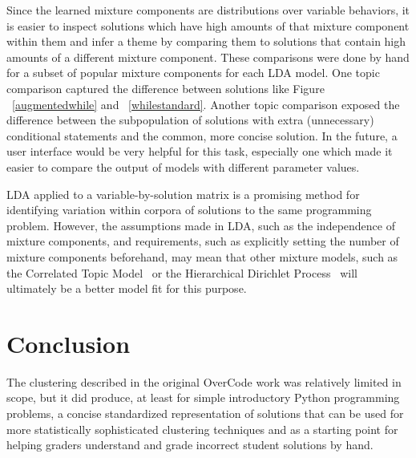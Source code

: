 Since the learned mixture components are distributions over variable behaviors, it is easier to inspect solutions which have high amounts of that mixture component within them and infer a theme by comparing them to solutions that contain high amounts of a different mixture component. These comparisons were done by hand for a subset of popular mixture components for each LDA model. One topic comparison captured the difference between solutions like Figure ~\ref{augmentedwhile} and ~\ref{whilestandard}. Another topic comparison exposed the difference between the subpopulation of solutions with extra (unnecessary) conditional statements and the common, more concise solution. In the future, a user interface would be very helpful for this task, especially one which made it easier to compare the output of models with different parameter values. 

LDA applied to a variable-by-solution matrix is a promising method for identifying variation within corpora of solutions to the same programming problem. However, the assumptions made in LDA, such as the independence of mixture components, and requirements, such as explicitly setting the number of mixture components beforehand, may mean that other mixture models, such as the Correlated Topic Model~\cite{} or the Hierarchical Dirichlet Process~\cite{} will ultimately be a better model fit for this purpose.



\section{Conclusion}
The clustering described in the original OverCode work was relatively limited in scope, but it did produce, at least for simple introductory Python programming problems, a concise standardized representation of solutions that can be used for more statistically sophisticated clustering techniques and as a starting point for helping graders understand and grade incorrect student solutions by hand.

